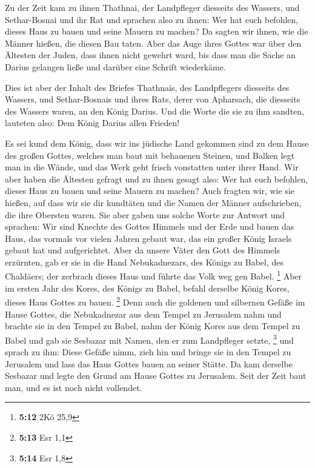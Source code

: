  Zu der Zeit kam zu ihnen Thathnai, der Landpfleger
diesseits des Wassers, und Sethar-Bosnai und ihr Rat und sprachen also
zu ihnen: Wer hat euch befohlen, dieses Haus zu bauen und seine Mauern
zu machen?  Da sagten wir ihnen, wie die Männer hießen, die
diesen Bau taten.  Aber das Auge ihres Gottes war über den
Ältesten der Juden, dass ihnen nicht gewehrt ward, bis dass man die
Sache an Darius gelangen ließe und darüber eine Schrift wiederkäme.

 Dies ist aber der Inhalt des Briefes Thathnais, des
Landpflegers diesseits des Wassers, und Sethar-Bosnais und ihres Rats,
derer von Apharsach, die diesseits des Wassers waren, an den König
Darius.  Und die Worte die sie zu ihm sandten, lauteten
also: Dem König Darius allen Frieden!

 Es sei kund dem König, dass wir ins jüdische Land gekommen
sind zu dem Hause des großen Gottes, welches man baut mit behauenen
Steinen, und Balken legt man in die Wände, und das Werk geht frisch
vonstatten unter ihrer Hand.  Wir aber haben die Ältesten
gefragt und zu ihnen gesagt also: Wer hat euch befohlen, dieses Haus zu
bauen und seine Mauern zu machen?  Auch fragten wir, wie
sie hießen, auf dass wir sie dir kundtäten und die Namen der Männer
aufschrieben, die ihre Obersten waren.  Sie aber gaben uns
solche Worte zur Antwort und sprachen: Wir sind Knechte des Gottes
Himmels und der Erde und bauen das Haus, das vormals vor vielen Jahren
gebaut war, das ein großer König Israels gebaut hat und aufgerichtet.
 Aber da unsere Väter den Gott des Himmels erzürnten, gab
er sie in die Hand Nebukadnezars, des Königs zu Babel, des Chaldäers;
der zerbrach dieses Haus und führte das Volk weg gen Babel. \footnote{\textbf{5:12}
  2Kö 25,9}  Aber im ersten Jahr des Kores, des Königs zu
Babel, befahl derselbe König Kores, dieses Haus Gottes zu bauen.
\footnote{\textbf{5:13} Esr 1,1}  Denn auch die goldenen
und silbernen Gefäße im Hause Gottes, die Nebukadnezar aus dem Tempel zu
Jerusalem nahm und brachte sie in den Tempel zu Babel, nahm der König
Kores aus dem Tempel zu Babel und gab sie Sesbazar mit Namen, den er zum
Landpfleger setzte, \footnote{\textbf{5:14} Esr 1,8}  und
sprach zu ihm: Diese Gefäße nimm, zieh hin und bringe sie in den Tempel
zu Jerusalem und lass das Haus Gottes bauen an seiner Stätte.
 Da kam derselbe Sesbazar und legte den Grund am Hause
Gottes zu Jerusalem. Seit der Zeit baut man, und es ist noch nicht
vollendet.

